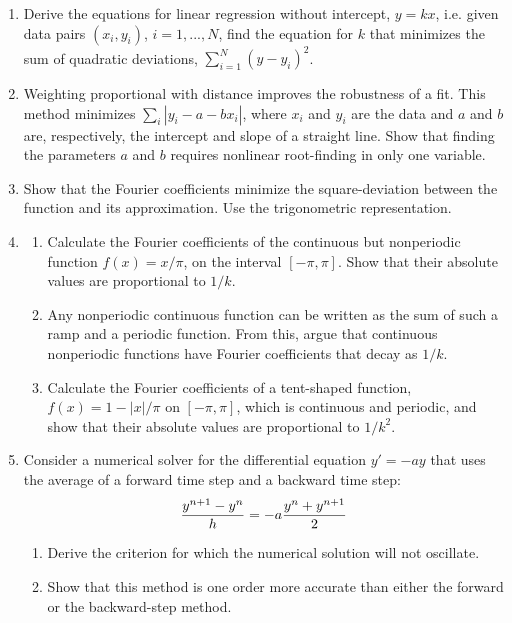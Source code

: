 \documentclass{article}
\begin{document}
\begin{enumerate}
\item
Derive the equations for linear regression without intercept, $y=k x$, i.e. given data pairs $(x_i,y_i)$, $i=1,...,N$, find the equation for $k$ that minimizes the sum of quadratic deviations, $\sum_{i=1}^N (y-y_i)^2$.

\item
Weighting proportional with distance improves the robustness of a fit.  This method minimizes $\sum_{i}|y_i -a-bx_i|$, where $x_i$ and $y_i$ are the data and $a$ and $b$ are, respectively, the intercept and slope of a straight line.  Show that finding the parameters $a$ and $b$ requires nonlinear root-finding in only one variable.


\item \label{prbl:fourier2min}
  Show that the Fourier coefficients minimize the square-deviation between the function and its approximation. Use the trigonometric representation.

  
\item \label{prbl:fourier}
\begin{enumerate}\setlength{\itemsep}{0pt}
\item Calculate the Fourier coefficients of the continuous but nonperiodic function $f(x)=x/\pi$, on the interval $[-\pi,\pi]$. Show that their absolute values are proportional to $1/k$.
\item Any nonperiodic continuous function can be written as the sum of such a ramp and a periodic function. From this, argue that continuous nonperiodic functions have Fourier coefficients that decay as $1/k$.
\item Calculate the Fourier coefficients of a tent-shaped function, $f(x)=1-|x|/\pi$ on $[-\pi,\pi]$, which is continuous and periodic, and show that their absolute values are proportional to $1/k^{2}$.
\end{enumerate}


\item \label{prbl:odesemi}
  Consider a numerical solver for the differential equation $y'=-ay$ that uses the average of a forward time step and a backward time step:
\[
{ y^{n+1} - y^n \over h} = -a {y^n + y^{n+1} \over 2}
\]
\begin{enumerate} \setlength{\itemsep}{0pt}
\item Derive the criterion for which the numerical solution will not oscillate.
\item Show that this method is one order more accurate than either the forward or the backward-step method.
\end{enumerate}




\end{enumerate}
\end{document}
